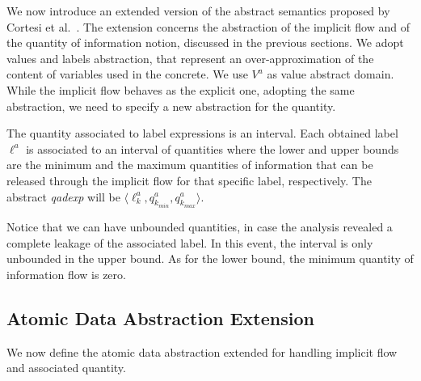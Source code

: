\documentclass{llncs}
\begin{document}
\noindent We now introduce an extended version of the abstract semantics proposed by Cortesi et al.~\cite{Cortesi15}. The extension concerns the abstraction of the implicit flow and of the quantity of information notion, discussed in the previous sections. We adopt values and labels abstraction, that represent an over-approximation of the content of variables used in the concrete. We use $V^a$ as value abstract domain. While the implicit flow behaves as the explicit one, adopting the same abstraction, we need to specify a new abstraction for the quantity. 

\begin{definition}\label{quant_abs}
The quantity associated to label expressions is an interval. Each obtained label $\ell^a$ is associated to an interval of quantities where the lower and upper bounds are the minimum and the maximum quantities of information that can be released through the implicit flow for that specific label, respectively. The abstract \emph{qadexp} will be $\langle \ell^a_k, q^a_{k_{min}}, q^a_{k_{max}} \rangle$.
\end{definition}

\noindent Notice that we can have unbounded quantities, in case the analysis revealed a complete leakage of the associated label. In this event, the interval is only unbounded in the upper bound. As for the lower bound, the minimum quantity of information flow is zero.

\subsection{Atomic Data Abstraction Extension}
We now define the atomic data abstraction extended for handling implicit flow and associated quantity. 
\end{document}
